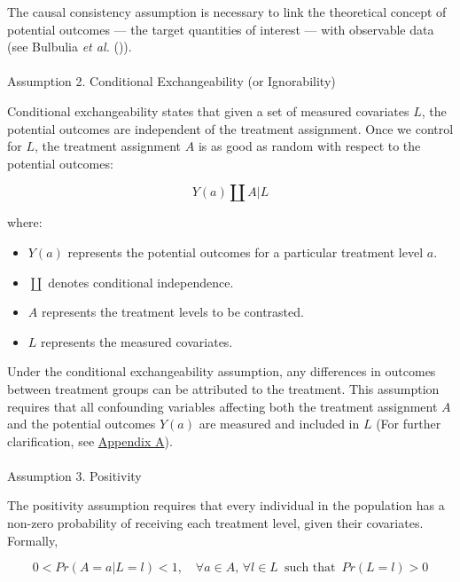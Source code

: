 \documentclass[
  single column]{article}
\makeatletter
\let\oldparagraph\paragraph
\renewcommand{\paragraph}{
    \@ifstar
      \xxxParagraphStar
      \xxxParagraphNoStar
  }
\newcommand{\xxxParagraphStar}[1]{\oldparagraph*{#1}\mbox{}}
\newcommand{\xxxParagraphNoStar}[1]{\oldparagraph{#1}\mbox{}}
\providecommand{\tightlist}{%
  \setlength{\itemsep}{0pt}\setlength{\parskip}{0pt}}\usepackage{longtable,booktabs,array}
\makeatother
\begin{document}
The causal consistency assumption is necessary to link the theoretical
concept of potential outcomes --- the target quantities of interest ---
with observable data (see Bulbulia \emph{et al.}
()).

\paragraph{Assumption 2. Conditional Exchangeability (or
Ignorability)}\label{assumption-2.-conditional-exchangeability-or-ignorability}

Conditional exchangeability states that given a set of measured
covariates \(L\), the potential outcomes are independent of the
treatment assignment. Once we control for \(L\), the treatment
assignment \(A\) is as good as random with respect to the potential
outcomes:

\[
Y(a) \coprod A | L
\]

where:

\begin{itemize}
\tightlist
\item
  \(Y(a)\) represents the potential outcomes for a particular treatment
  level \(a\).
\item
  \(\coprod\) denotes conditional independence.
\item
  \(A\) represents the treatment levels to be contrasted.
\item
  \(L\) represents the measured covariates.
\end{itemize}

Under the conditional exchangeability assumption, any differences in
outcomes between treatment groups can be attributed to the treatment.
This assumption requires that all confounding variables affecting both
the treatment assignment \(A\) and the potential outcomes \(Y(a)\) are
measured and included in \(L\) (For further clarification, see
\hyperref[id-app-a]{Appendix A}).

\paragraph{Assumption 3. Positivity}\label{assumption-3.-positivity}

The positivity assumption requires that every individual in the
population has a non-zero probability of receiving each treatment level,
given their covariates. Formally,

\[
0 < Pr(A = a | L = l) < 1, \quad \forall a \in A, \, \forall l \in L \, \text{ such that } \, Pr(L = l) > 0
\]
\end{document}
